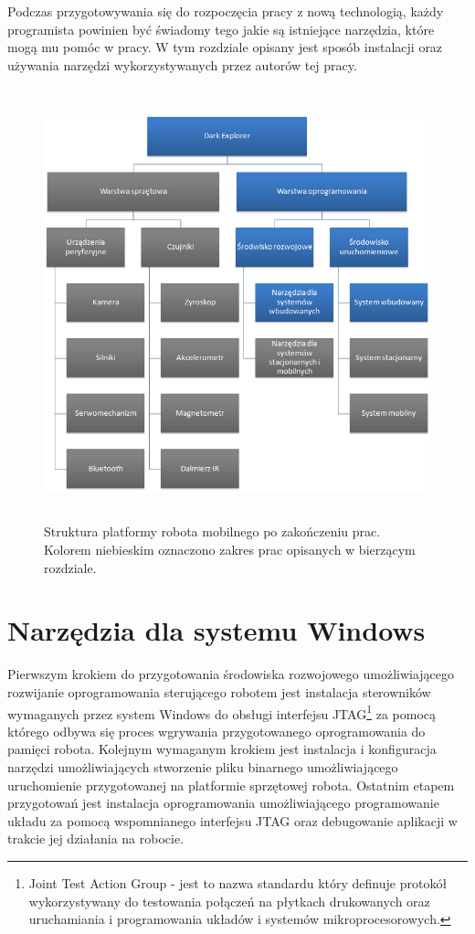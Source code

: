 Podczas przygotowywania się do rozpoczęcia pracy z nową technologią, każdy
programista powinien być świadomy tego jakie są istniejące narzędzia, które mogą
mu pomóc w pracy. W tym rozdziale opisany jest sposób instalacji oraz używania
narzędzi wykorzystywanych przez autorów tej pracy.

\begin{figure}[!ht]
 \centering
 \includegraphics[height=125mm]{../images/ch03/dark_explorer_platform_ide_embeded.png}
 \caption{Struktura platformy robota mobilnego po zakończeniu prac. Kolorem niebieskim oznaczono zakres prac opisanych w bierzącym rozdziale.}
 \label{fig:DarkExplorerPlatformIDE}
\end{figure}

\section{Narzędzia dla systemu Windows}
\label{sec:embeded-win-tools}
Pierwszym krokiem do przygotowania środowiska rozwojowego umożliwiającego
rozwijanie oprogramowania sterującego robotem jest instalacja sterowników
wymaganych przez system Windows do obsługi interfejsu JTAG\footnote{Joint Test
Action Group - jest to nazwa standardu który definuje protokół wykorzystywany do
testowania połączeń na płytkach drukowanych oraz uruchamiania i programowania
układów i systemów mikroprocesorowych. } za pomocą którego odbywa się proces
wgrywania przygotowanego oprogramowania do pamięci robota. Kolejnym wymaganym
krokiem jest instalacja i konfiguracja narzędzi umożliwiających stworzenie pliku
binarnego umożliwiającego uruchomienie przygotowanej na platformie sprzętowej
robota. Ostatnim etapem przygotowań jest instalacja oprogramowania
umożliwiającego programowanie układu za pomocą wspomnianego interfejsu JTAG oraz
debugowanie aplikacji w trakcie jej działania na robocie.

